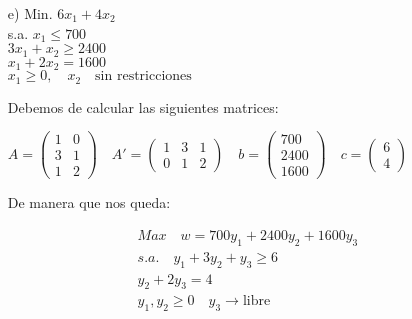 \begin{itemize}
    \item[e)] Min. \quad $6x_1 + 4x_2$ \\
    s.a. \quad $x_1 \leq 700$ \\
    \quad \quad $3x_1 + x_2 \geq 2400$ \\
    \quad \quad $x_1 + 2x_2 = 1600$ \\
    \quad \quad $x_1 \geq 0, \quad x_2 \quad \text{sin restricciones}$

    Debemos de calcular las siguientes matrices:

    $ A =
    \begin{pmatrix}
        1 & 0 \\
        3 & 1 \\
        1 & 2
    \end{pmatrix} \quad
    A' = \begin{pmatrix}
        1 & 3 & 1 \\
        0 & 1 & 2
    \end{pmatrix}
    \quad b = \begin{pmatrix}
        700 \\
        2400 \\
        1600
    \end{pmatrix} \quad c = \begin{pmatrix}
        6 \\
        4
    \end{pmatrix}
    $       

    De manera que nos queda:

    \begin{align*}
        Max \quad w = 700y_1 + 2400y_2 + 1600y_3 \\
        s.a. \quad y_1 + 3y_2 + y_3 \geq 6 \\
        y_2 + 2y_3 = 4 \\
        y_1, y_2 \geq 0 \quad y_3 \rightarrow \text{libre}
    \end{align*}
\end{itemize}
